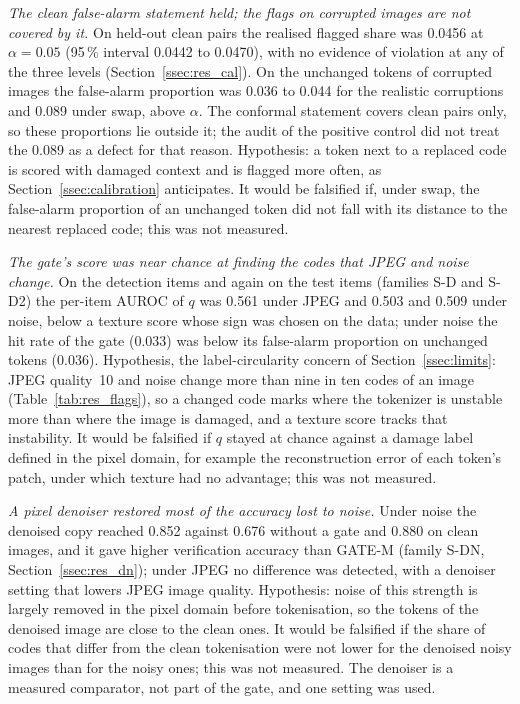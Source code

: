 \emph{The clean false-alarm statement held; the flags on corrupted images are not covered by it.}
On held-out clean pairs the realised flagged share was 0.0456 at $\alpha=0.05$ (95\,\% interval 0.0442 to 0.0470), with no evidence
of violation at any of the three levels (Section~\ref{ssec:res_cal}).
On the unchanged tokens of corrupted images the false-alarm proportion was 0.036 to 0.044 for the realistic corruptions and 0.089 under
swap, above $\alpha$.
The conformal statement covers clean pairs only, so these proportions lie outside it; the audit of the positive control
did not treat the 0.089 as a defect for that reason.
Hypothesis: a token next to a replaced code is scored with damaged context and is flagged more often, as Section~\ref{ssec:calibration}
anticipates.
It would be falsified if, under swap, the false-alarm proportion of an unchanged token did not fall with its distance to the nearest
replaced code; this was not measured.

\emph{The gate's score was near chance at finding the codes that JPEG and noise change.}
On the detection items and again on the test items (families S-D and S-D2) the per-item AUROC of $q$ was 0.561 under JPEG and 0.503 and
0.509 under noise, below a texture score whose sign was chosen on the data; under noise the hit rate of the gate (0.033) was below its
false-alarm proportion on unchanged tokens (0.036).
Hypothesis, the label-circularity concern of Section~\ref{ssec:limits}: JPEG quality~10 and noise change more than nine in ten codes of
an image (Table~\ref{tab:res_flags}), so a changed code marks where the tokenizer is unstable more than where the image is damaged, and a
texture score tracks that instability.
It would be falsified if $q$ stayed at chance against a damage label defined in the pixel domain, for example the reconstruction error
of each token's patch, under which texture had no advantage; this was not measured.

\emph{A pixel denoiser restored most of the accuracy lost to noise.}
Under noise the denoised copy reached 0.852 against 0.676 without a gate and 0.880 on clean images, and it gave higher verification
accuracy than GATE-M (family S-DN, Section~\ref{ssec:res_dn}); under JPEG no difference was detected, with a denoiser setting that
lowers JPEG image quality.
Hypothesis: noise of this strength is largely removed in the pixel domain before tokenisation, so the tokens of the denoised image are
close to the clean ones.
It would be falsified if the share of codes that differ from the clean tokenisation were not lower for the denoised noisy images than for
the noisy ones; this was not measured.
The denoiser is a measured comparator, not part of the gate, and one setting was used.

